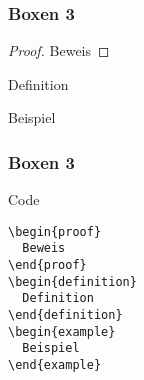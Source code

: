 \begin{frame}
  \frametitle{Boxen 3}
  \begin{proof}
    Beweis
  \end{proof}
  \begin{definition}
    Definition
  \end{definition}
  \begin{example}
    Beispiel
  \end{example}
\end{frame}
\begin{frame}[fragile]
  \frametitle{Boxen 3}
  \begin{block}{Code}
    \begin{verbatim}
\begin{proof}
  Beweis
\end{proof}
\begin{definition}
  Definition
\end{definition}
\begin{example}
  Beispiel
\end{example}
    \end{verbatim}
  \end{block}
\end{frame}
